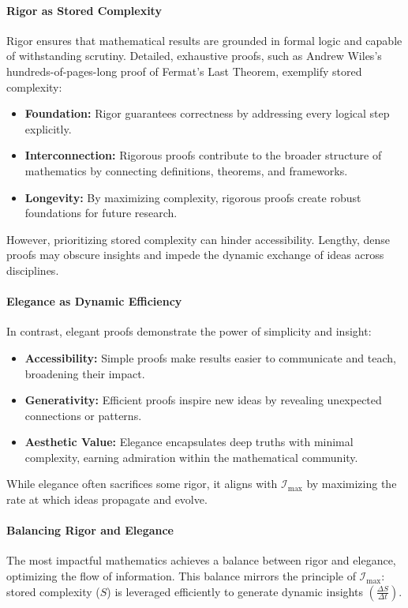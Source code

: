 \documentclass[12pt]{article}
\begin{document}
\paragraph{Rigor as Stored Complexity}
Rigor ensures that mathematical results are grounded in formal logic and capable of withstanding scrutiny. Detailed, exhaustive proofs, such as Andrew Wiles’s hundreds-of-pages-long proof of Fermat’s Last Theorem, exemplify stored complexity:
\begin{itemize}
    \item \textbf{Foundation:} Rigor guarantees correctness by addressing every logical step explicitly.
    \item \textbf{Interconnection:} Rigorous proofs contribute to the broader structure of mathematics by connecting definitions, theorems, and frameworks.
    \item \textbf{Longevity:} By maximizing complexity, rigorous proofs create robust foundations for future research.
\end{itemize}

However, prioritizing stored complexity can hinder accessibility. Lengthy, dense proofs may obscure insights and impede the dynamic exchange of ideas across disciplines.

\paragraph{Elegance as Dynamic Efficiency}
In contrast, elegant proofs demonstrate the power of simplicity and insight:
\begin{itemize}
    \item \textbf{Accessibility:} Simple proofs make results easier to communicate and teach, broadening their impact.
    \item \textbf{Generativity:} Efficient proofs inspire new ideas by revealing unexpected connections or patterns.
    \item \textbf{Aesthetic Value:} Elegance encapsulates deep truths with minimal complexity, earning admiration within the mathematical community.
\end{itemize}

While elegance often sacrifices some rigor, it aligns with \(\mathcal{I}_{\text{max}}\) by maximizing the rate at which ideas propagate and evolve.

\paragraph{Balancing Rigor and Elegance}
The most impactful mathematics achieves a balance between rigor and elegance, optimizing the flow of information. This balance mirrors the principle of \(\mathcal{I}_{\text{max}}\): stored complexity (\(S\)) is leveraged efficiently to generate dynamic insights \(\left(\frac{\Delta S}{\Delta t}\right)\).
\end{document}
